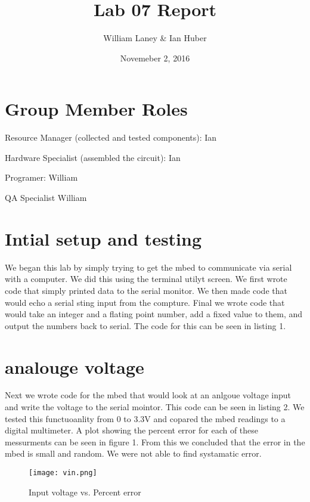 \documentclass[prl,12pt,notitlepage,aps,onecolumn,superscriptaddress]{revtex4-1}
\begin{document}
\title{Lab 07 Report}
\author{William Laney \& Ian Huber}
\date{Novemeber 2, 2016}
\maketitle

\section{Group Member Roles}
Resource Manager (collected and tested components): Ian

Hardware Specialist (assembled the circuit): Ian

Programer: William

QA Specialist William

\section{Intial setup and testing}
We began this lab by simply trying to get the mbed to communicate via serial with a computer. We did this using the terminal utilyt screen. We first wrote code that simply printed data to the serial monitor. We then made code that would echo a serial sting input from the compture. Final we wrote code that would take an integer and a flating point number, add a fixed value to them, and output the numbers back to serial. The code for this can be seen in listing 1. 

\section{analouge voltage}
Next we wrote code for the mbed that would look at an anlgoue voltage input and write the voltage to the serial mointor. This code can be seen in listing 2. We tested this functuoanlity from 0 to 3.3V and copared the mbed readings to a digital multimeter. A plot showing the percent error for each of these messurments can be seen in figure 1. From this we concluded that the error in the mbed is small and random. We were not able to find systamatic error.

\begin{figure}[h]
\begin{center}
\texttt{[image: vin.png]}
\end{center}
\caption{\label{fig:pic} Input voltage vs. Percent error}
\end{figure}
\end{document}
